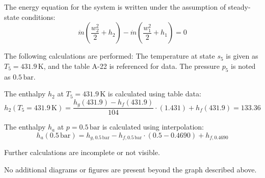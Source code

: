 The energy equation for the system is written under the assumption of steady-state conditions:  
\[
\dot{m} \left( \frac{w_2^2}{2} + h_2 \right) - \dot{m} \left( \frac{w_1^2}{2} + h_1 \right) = 0
\]  

The following calculations are performed:  
The temperature at state \( s_5 \) is given as \( T_5 = 431.9 \, \text{K} \), and the table A-22 is referenced for data. The pressure \( p_5 \) is noted as \( 0.5 \, \text{bar} \).  

The enthalpy \( h_2 \) at \( T_5 = 431.9 \, \text{K} \) is calculated using table data:  
\[
h_2(T_5 = 431.9 \, \text{K}) = \frac{h_{g}(431.9) - h_{f}(431.9)}{104} \cdot (1.431) + h_{f}(431.9) = 133.36
\]  

The enthalpy \( h_a \) at \( p = 0.5 \, \text{bar} \) is calculated using interpolation:  
\[
h_a(0.5 \, \text{bar}) = h_{g,0.5 \, \text{bar}} - h_{f,0.5 \, \text{bar}} \cdot (0.5 - 0.4690) + h_{f,0.4690}
\]  

Further calculations are incomplete or not visible.  

No additional diagrams or figures are present beyond the graph described above.